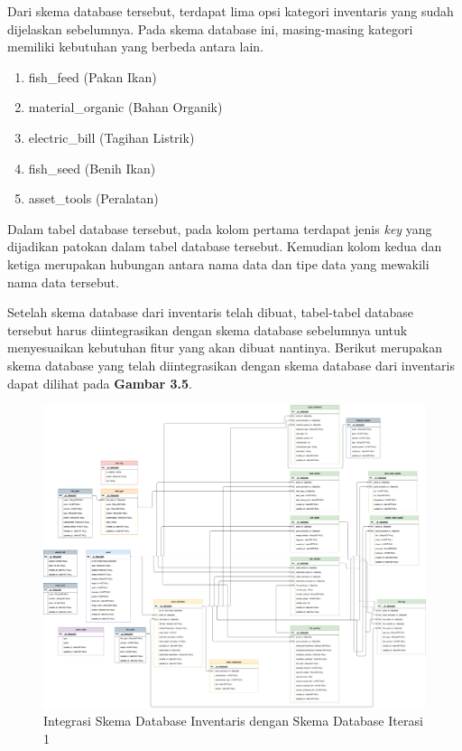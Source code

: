 \begin{enumerate}
\begin{enumerate}
		Dari skema database tersebut, terdapat lima opsi kategori inventaris yang sudah dijelaskan sebelumnya. Pada skema database ini, masing-masing kategori memiliki kebutuhan yang berbeda antara lain.
	
		\begin{enumerate}
			\item fish\_feed (Pakan Ikan)
			\item material\_organic (Bahan Organik)
			\item electric\_bill (Tagihan Listrik)
			\item fish\_seed (Benih Ikan)
			\item asset\_tools (Peralatan)
		\end{enumerate}
	
		Dalam tabel database tersebut, pada kolom pertama terdapat jenis \textit{key} yang dijadikan patokan dalam tabel database tersebut. Kemudian kolom kedua dan ketiga merupakan hubungan antara nama data dan tipe data yang mewakili nama data tersebut.
	
		Setelah skema database dari inventaris telah dibuat, tabel-tabel database tersebut harus diintegrasikan dengan skema database sebelumnya untuk menyesuaikan kebutuhan fitur yang akan dibuat nantinya. Berikut merupakan skema database yang telah diintegrasikan dengan skema database dari inventaris dapat dilihat pada \textbf{Gambar 3.5}.
	
		\begin{figure}[H]
			\centering
			\includegraphics[width=1\textwidth]{gambar/sprint1/sprint1_skema_database.png}
			\caption{Integrasi Skema Database Inventaris dengan Skema Database Iterasi 1}
		\end{figure}


\end{enumerate}
\end{enumerate}
